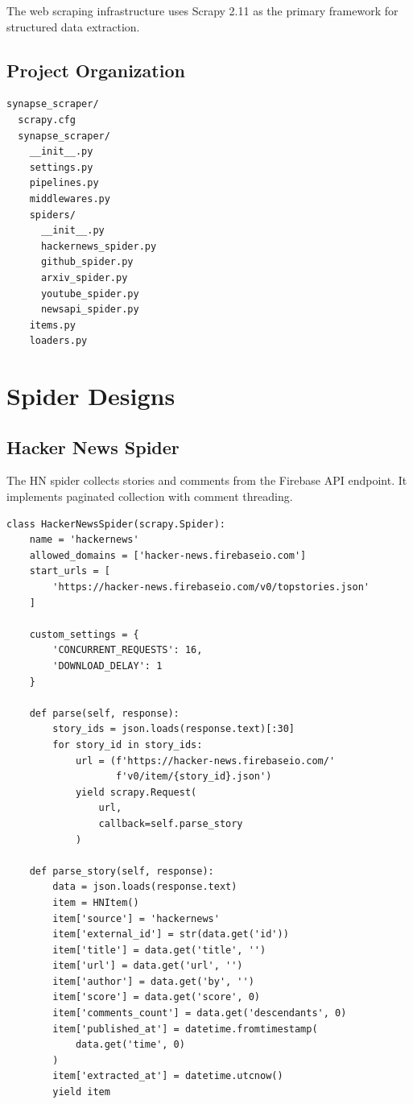 \documentclass[12pt,a4paper]{report}
\begin{document}
The web scraping infrastructure uses Scrapy 2.11 as the primary framework for structured data extraction.

\subsection{Project Organization}

\begin{lstlisting}
synapse_scraper/
  scrapy.cfg
  synapse_scraper/
    __init__.py
    settings.py
    pipelines.py
    middlewares.py
    spiders/
      __init__.py
      hackernews_spider.py
      github_spider.py
      arxiv_spider.py
      youtube_spider.py
      newsapi_spider.py
    items.py
    loaders.py
\end{lstlisting}

\section{Spider Designs}

\subsection{Hacker News Spider}

The HN spider collects stories and comments from the Firebase API endpoint. It implements paginated collection with comment threading.

\begin{lstlisting}
class HackerNewsSpider(scrapy.Spider):
    name = 'hackernews'
    allowed_domains = ['hacker-news.firebaseio.com']
    start_urls = [
        'https://hacker-news.firebaseio.com/v0/topstories.json'
    ]
    
    custom_settings = {
        'CONCURRENT_REQUESTS': 16,
        'DOWNLOAD_DELAY': 1
    }
    
    def parse(self, response):
        story_ids = json.loads(response.text)[:30]
        for story_id in story_ids:
            url = (f'https://hacker-news.firebaseio.com/'
                   f'v0/item/{story_id}.json')
            yield scrapy.Request(
                url,
                callback=self.parse_story
            )
    
    def parse_story(self, response):
        data = json.loads(response.text)
        item = HNItem()
        item['source'] = 'hackernews'
        item['external_id'] = str(data.get('id'))
        item['title'] = data.get('title', '')
        item['url'] = data.get('url', '')
        item['author'] = data.get('by', '')
        item['score'] = data.get('score', 0)
        item['comments_count'] = data.get('descendants', 0)
        item['published_at'] = datetime.fromtimestamp(
            data.get('time', 0)
        )
        item['extracted_at'] = datetime.utcnow()
        yield item
\end{lstlisting}
\end{document}

